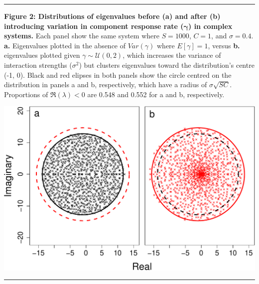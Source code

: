 \documentclass[]{article}
\begin{document}
\begin{center}\rule{0.5\linewidth}{\linethickness}\end{center}

\textbf{Figure 2: Distributions of eigenvalues before (a) and after (b)
introducing variation in component response rate
(\(\boldsymbol{\gamma}\)) in complex systems.} Each panel show the same
system where \(S = 1000\), \(C = 1\), and \(\sigma = 0.4\). \textbf{a.}
Eigenvalues plotted in the absence of \(Var(\gamma)\) where
\(E[\gamma] = 1\), versus \textbf{b.} eigenvalues plotted given
\(\gamma \sim \mathcal{U}(0, 2)\), which increases the variance of
interaction strengths (\(\sigma^{2}\)) but clusters eigenvalues toward
the distribution's centre (-1, 0). Black and red elipses in both panels
show the circle centred on the distribution in panels a and b,
respectively, which have a radius of \(\sigma \sqrt{SC}\). Proportions
of \(\Re(\lambda) < 0\) are 0.548 and 0.552 for a and b, respectively.

\includegraphics{unnamed-chunk-7-1.pdf}

\begin{center}\rule{0.5\linewidth}{\linethickness}\end{center}
\end{document}
